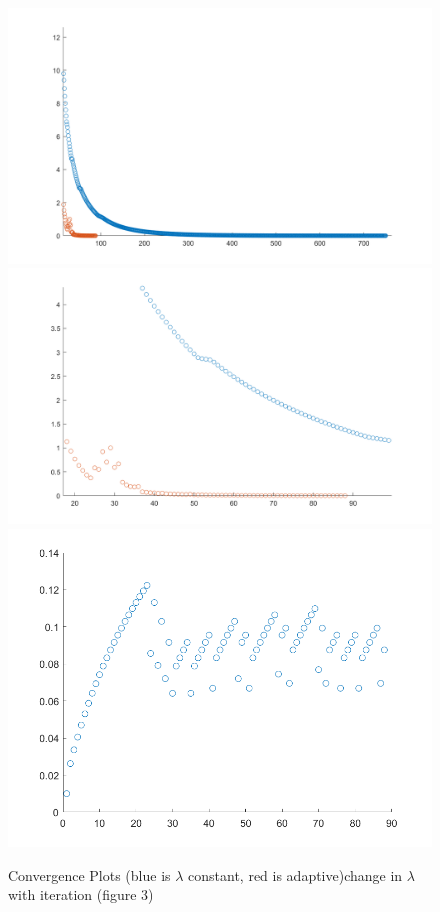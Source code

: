 \documentclass[11pt, a4paper]{article}
\theoremstyle{definition}
\begin{document}
\begin{figure}[h]
	\centering
	\includegraphics[scale=0.6]{Ex11.png}
	\includegraphics[scale=0.4]{Ex11a.png}
	\includegraphics[scale=0.4]{lambdaVec11.png}
	\caption{Convergence Plots (blue is $\lambda$ constant, red is adaptive)change in $\lambda$ with iteration (figure 3)} 
	\label{F4}
\end{figure}	
	
\end{document}
